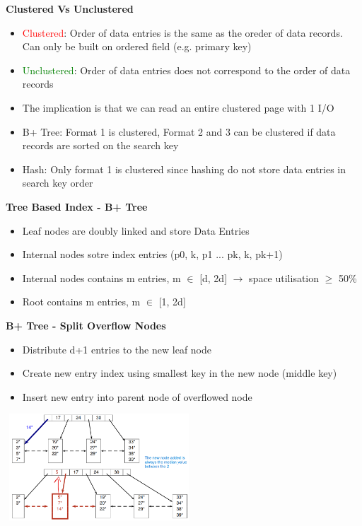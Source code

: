 \documentclass[10pt, landscape]{article}
\begin{document}
\begin{multicols}{4}
\textbf{Clustered Vs Unclustered}
\begin{itemize}
  \item \textcolor{red}{Clustered}: Order of data entries is the same as the oreder of data records. Can only be built on ordered field (e.g. primary key)
  \item \textcolor{green}{Unclustered}: Order of data entries does not correspond to the order of data records
  \item The implication is that we can read an entire clustered page with 1 I/O
  \item  B+ Tree: Format 1 is clustered, Format 2 and 3 can be clustered if data records are sorted on the search key
  \item Hash: Only format 1 is clustered since hashing do not store data entries in search key order
\end{itemize}

\textbf{Tree Based Index - B+ Tree}
\begin{itemize}
  \item Leaf nodes are doubly linked and store Data Entries
  \item Internal nodes sotre index entries (p0, k, p1 ... pk, k, pk+1)
  \item Internal nodes contains m entries,  m $\in$ [d, 2d] $\rightarrow$ space utilisation $\geq$ 50\%
  \item Root contains m entries, m $\in$ [1, 2d]
\end{itemize}

\textbf{B+ Tree - Split Overflow Nodes}
\begin{itemize}
  \item Distribute d+1 entries to the new leaf node
  \item Create new entry index using smallest key in the new node (middle key)
  \item Insert new entry into parent node of overflowed node
\end{itemize}
\includegraphics[width=7cm, height=4cm]{split_overflow_node.png}


\end{multicols}
\end{document}
